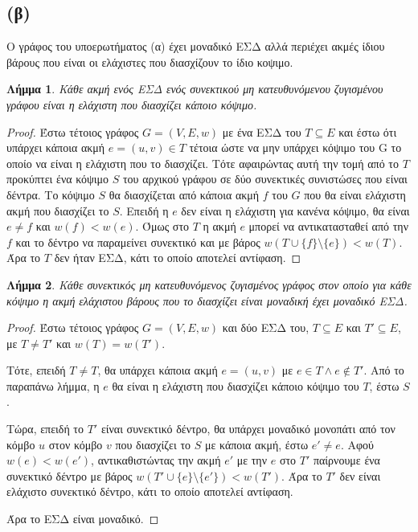 \documentclass[11pt,a4paper,oneside]{report}
\newtheorem*{lemma}{Λήμμα}
\begin{document}
\subsection*{(β)}
Ο γράφος του υποερωτήματος (α) έχει μοναδικό ΕΣΔ αλλά περιέχει ακμές ίδιου βάρους που είναι οι ελάχιστες που διασχίζουν το ίδιο κοψιμο.

\begin{lemma}
Κάθε ακμή ενός ΕΣΔ ενός συνεκτικού μη κατευθυνόμενου ζυγισμένου γράφου είναι η ελάχιστη που διασχίζει κάποιο κόψιμο.
\end{lemma}
\begin{proof}
Έστω τέτοιος γράφος $G = (V, E, w)$ με ένα ΕΣΔ του $T \subseteq E$ και έστω ότι υπάρχει κάποια ακμή $e = (u, v) \in T$ τέτοια ώστε να μην υπάρχει κόψιμο του G το οποίο να είναι η ελάχιστη που το διασχίζει. Τότε αφαιρώντας αυτή την τομή από το $T$ προκύπτει ένα κόψιμο $S$ του αρχικού γράφου σε δύο συνεκτικές συνιστώσες που είναι δέντρα. Το κόψιμο $S$ θα διασχίζεται από κάποια ακμή $f$ του $G$ που θα είναι ελάχιστη ακμή που διασχίζει το $S$. Επειδή η $e$ δεν είναι η ελάχιστη για κανένα κόψιμο, θα είναι $e \neq f$ και $w(f) < w(e)$. Όμως στο $T$ η ακμή $e$ μπορεί να αντικατασταθεί από την $f$ και το δέντρο να παραμείνει συνεκτικό και με βάρος $w( T \cup \{f\} \setminus \{e\}) < w( T )$. Άρα το $T$ δεν ήταν ΕΣΔ, κάτι το οποίο αποτελεί αντίφαση.
\end{proof}

\begin{lemma}
Κάθε συνεκτικός μη κατευθυνόμενος ζυγισμένος γράφος στον οποίο για κάθε κόψιμο η ακμή ελάχιστου βάρους που το διασχίζει είναι μοναδική έχει μοναδικό ΕΣΔ.
\end{lemma}
\begin{proof}
Έστω τέτοιος γράφος $G = (V, E, w)$ και δύο ΕΣΔ του, $T \subseteq E$ και $T' \subseteq E$,
με $T \neq T'$ και $w(T) = w(T')$.

Τότε, επειδή $T \neq T$, θα υπάρχει κάποια ακμή $e = (u, v)$ με $e \in T \land e \not\in T'$. Από το παραπάνω λήμμα, η $e$ θα είναι η ελάχιστη που διασχίζει κάποιο κόψιμο του $T$, έστω $S$.

Τώρα, επειδή το $T'$ είναι συνεκτικό δέντρο, θα υπάρχει μοναδικό μονοπάτι από τον κόμβο $u$ στον κόμβο $v$ που διασχίζει το $S$ με κάποια ακμή, έστω $e' \neq e$. Αφού $w(e) < w(e')$, αντικαθιστώντας την ακμή $e'$ με την $e$ στο $T'$ παίρνουμε ένα συνεκτικό δέντρο με βάρος $w(T' \cup\{e\} \setminus \{e'\}) < w(T')$. Άρα το $T'$ δεν είναι ελάχιστο συνεκτικό δέντρο, κάτι το οποίο αποτελεί αντίφαση.

Άρα το ΕΣΔ είναι μοναδικό.
\end{proof}
\end{document}
